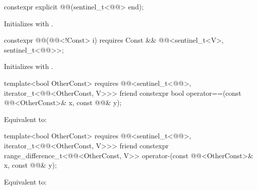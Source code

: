 %
\begin{itemdecl}
constexpr explicit @@(sentinel_t<@@> end);
\end{itemdecl}

\begin{itemdescr}
\pnum
\effects
Initializes  with .
\end{itemdescr}

%
\begin{itemdecl}
constexpr @@(@@<!Const> i)
  requires Const && @@<sentinel_t<V>, sentinel_t<@@>>;
\end{itemdecl}

\begin{itemdescr}
\pnum
\effects
Initializes  with .
\end{itemdescr}

%
\begin{itemdecl}
template<bool OtherConst>
  requires @@<sentinel_t<@@>, iterator_t<@@<OtherConst, V>>>
friend constexpr bool operator==(const @@<OtherConst>& x, const @@& y);
\end{itemdecl}

\begin{itemdescr}
\pnum
\effects
Equivalent to: 
\end{itemdescr}

%
\begin{itemdecl}
template<bool OtherConst>
  requires @@<sentinel_t<@@>, iterator_t<@@<OtherConst, V>>>
friend constexpr range_difference_t<@@<OtherConst, V>>
  operator-(const @@<OtherConst>& x, const @@& y);
\end{itemdecl}

\begin{itemdescr}
\pnum
\effects
Equivalent to: 
\end{itemdescr}


